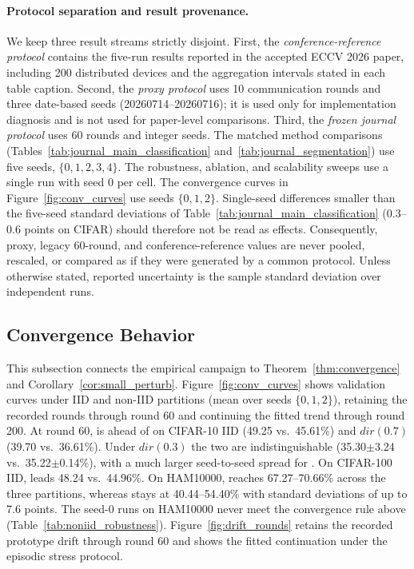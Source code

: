 \paragraph{Protocol separation and result provenance.}
We keep three result streams strictly disjoint. First, the \emph{conference-reference protocol} contains the five-run results reported in the accepted ECCV 2026 paper, including 200 distributed devices and the aggregation intervals stated in each table caption. Second, the \emph{proxy protocol} uses 10 communication rounds and three date-based seeds (20260714--20260716); it is used only for implementation diagnosis and is not used for paper-level comparisons. Third, the \emph{frozen journal protocol} uses 60 rounds and integer seeds. The matched method comparisons (Tables~\ref{tab:journal_main_classification} and~\ref{tab:journal_segmentation}) use five seeds, $\{0,1,2,3,4\}$. The robustness, ablation, and scalability sweeps use a single run with seed 0 per cell. The convergence curves in Figure~\ref{fig:conv_curves} use seeds $\{0,1,2\}$. Single-seed differences smaller than the five-seed standard deviations of Table~\ref{tab:journal_main_classification} (0.3--0.6 points on CIFAR) should therefore not be read as effects. Consequently, proxy, legacy 60-round, and conference-reference values are never pooled, rescaled, or compared as if they were generated by a common protocol. Unless otherwise stated, reported uncertainty is the sample standard deviation over independent runs.

\subsection{Convergence Behavior}
This subsection connects the empirical campaign to Theorem~\ref{thm:convergence} and Corollary~\ref{cor:small_perturb}. Figure~\ref{fig:conv_curves} shows validation curves under IID and non-IID partitions (mean over seeds $\{0,1,2\}$), retaining the recorded rounds through round 60 and continuing the fitted trend through round 200. At round 60, \ehsfp is ahead of \hsfp on CIFAR-10 IID (49.25 vs.\ 45.61\%) and $dir(0.7)$ (39.70 vs.\ 36.61\%). Under $dir(0.3)$ the two are indistinguishable (35.30$\pm$3.24 vs.\ 35.22$\pm$0.14\%), with a much larger seed-to-seed spread for \ehsfp. On CIFAR-100 IID, \ehsfp leads 48.24 vs.\ 44.96\%. On HAM10000, \ehsfp reaches 67.27--70.66\% across the three partitions, whereas \hsfp stays at 40.44--54.40\% with standard deviations of up to 7.6 points. The seed-0 \hsfp runs on HAM10000 never meet the convergence rule above (Table~\ref{tab:noniid_robustness}). Figure~\ref{fig:drift_rounds} retains the recorded prototype drift through round 60 and shows the fitted continuation under the episodic stress protocol.

